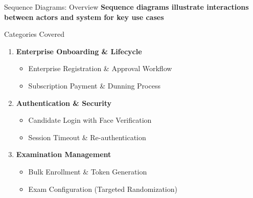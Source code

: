 \begin{frame}{Sequence Diagrams: Overview}
    \textbf{Sequence diagrams illustrate interactions between actors and system for key use cases}
    
    \begin{block}{Categories Covered}
        \begin{enumerate}
            \item \textbf{Enterprise Onboarding \& Lifecycle}
            \begin{itemize}
                \item Enterprise Registration \& Approval Workflow
                \item Subscription Payment \& Dunning Process
            \end{itemize}
            
            \item \textbf{Authentication \& Security}
            \begin{itemize}
                \item Candidate Login with Face Verification
                \item Session Timeout \& Re-authentication
            \end{itemize}
            
            \item \textbf{Examination Management}
            \begin{itemize}
                \item Bulk Enrollment \& Token Generation
                \item Exam Configuration (Targeted Randomization)
            \end{itemize}
        \end{enumerate}
    \end{block}
\end{frame}

